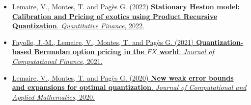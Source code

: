 \documentclass[]{deedy-resume-openfont}
\begin{document}
		\begin{itemize}
			\item[\diamond] \href{https://www.tandfonline.com/doi/abs/10.1080/14697688.2021.2023205?journalCode=rquf20}{Lemaire, V., Montes, T. and Pagès G. (2022) \textbf{Stationary Heston model: Calibration and Pricing of exotics using Product Recursive Quantization}. \textit{Quantitative Finance}, 2022.}
	
			\item[\diamond] \href{https://www.risk.net/journal-of-computational-finance/7869926/quantization-based-bermudan-option-pricing-in-the-foreign-exchange-world}{Fayolle, J.-M., Lemaire, V., Montes, T. and Pagès G. (2021) \textbf{Quantization-based Bermudan option pricing in the $FX$ world}. \textit{Journal of Computational Finance}, 2021.}
	
			\item[\diamond] \href{https://www.sciencedirect.com/science/article/abs/pii/S0377042719306752}{Lemaire, V., Montes, T. and Pagès G. (2020) \textbf{New weak error bounds and expansions for optimal quantization}. \textit{Journal of Computational and Applied Mathematics}, 2020.}
		\end{itemize}
	
	\sectionsep


	\vspace{-1.cm}
	\renewcommand\refname{\vskip -1.5em} %
	
	
	\nocite{*}






%
%
%
%
%
% 	
% 	
%
\end{document}
